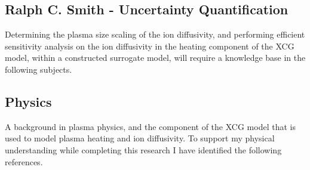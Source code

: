 \documentclass{article}
\begin{document}
\subsection*{Ralph C. Smith - Uncertainty Quantification}
Determining the plasma size scaling of the ion diffusivity, and performing efficient sensitivity analysis on the ion diffusivity in the heating component of the XCG model, within a constructed surrogate model, will require a knowledge base in the following subjects.\\  

\subsection*{Physics}
A background in plasma physics, and the component of the XCG model that is used to model plasma heating and ion diffusivity. To support my physical understanding while completing this research I have identified the following references.\\
\end{document}
